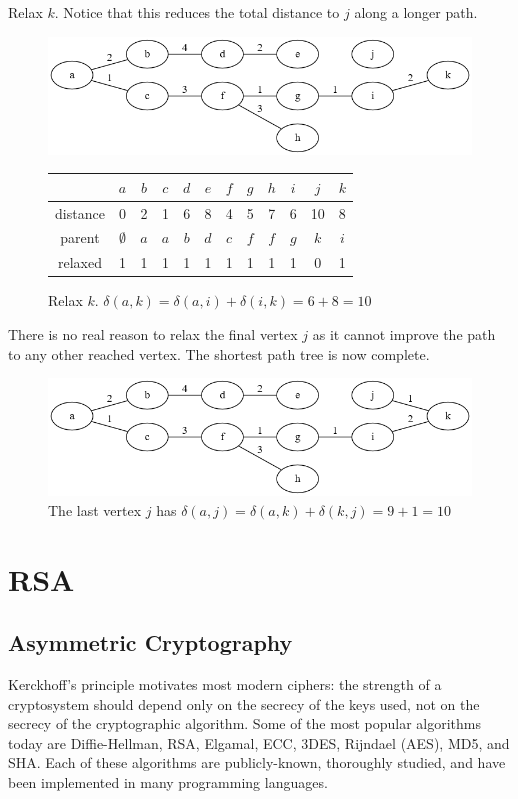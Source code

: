 \documentclass{book}
\begin{document}
Relax $k$. Notice that this reduces the total distance to $j$ along a longer path.

\begin{figure}[H]
\centering
\includegraphics[width=.75\textwidth]{ch-dijkstra/spf10}
  \begin{tabular}{ | c | c | c | c | c | c | c | c | c | c | c | c | }
  \hline
   & $a$ & $b$ & $c$ & $d$ & $e$ & $f$ & $g$ & $h$ & $i$ & $j$ & $k$ \\
   \hline
   distance & 0 & 2 & 1 & 6 & 8 & 4 & 5 & 7 & 6 & 10 & 8 \\
   \hline
   parent & $\emptyset$ & $a$ & $a$ & $b$ & $d$ & $c$ & $f$ & $f$ & $g$ & $k$ & $i$ \\
   \hline
   relaxed & 1 & 1 & 1 & 1 & 1 & 1 & 1 & 1 & 1 & 0 & 1 \\
   \hline
  \end{tabular}
\caption{Relax $k$. $\delta(a,k) = \delta(a,i) + \delta(i,k) = 6 + 8 = 10$}
\label{spf10}
\end{figure}

There is no real reason to relax the final vertex $j$ as it cannot improve the path to any other reached vertex. The shortest path tree is now complete.

\begin{figure}[H]
\centering
\includegraphics[width=.75\textwidth]{ch-dijkstra/spf11}
\caption{The last vertex $j$ has $\delta(a,j)=\delta(a,k)+\delta(k,j)=9+1=10$}
\label{spf11}
\end{figure}

\chapter{RSA}

\section{Asymmetric Cryptography}
Kerckhoff's principle motivates most modern ciphers: the strength of a cryptosystem should depend only on the secrecy of the keys used, not on the secrecy of the cryptographic algorithm. Some of the most popular algorithms today are Diffie-Hellman, RSA, Elgamal, ECC, 3DES, Rijndael (AES), MD5, and SHA. Each of these algorithms are publicly-known, thoroughly studied, and have been implemented in many programming languages.
\end{document}
